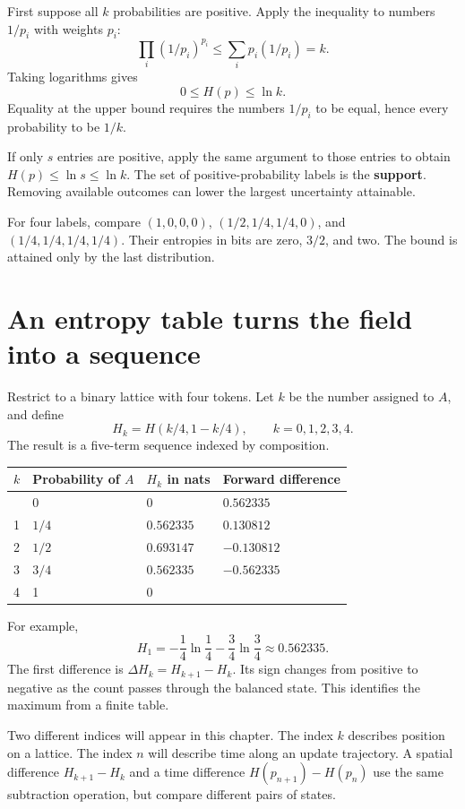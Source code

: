 \documentclass[11pt,oneside,openany]{book}
\theoremstyle{definition}
\theoremstyle{remark}
\numberwithin{equation}{chapter}
\begin{document}
First suppose all \(k\) probabilities are positive. Apply the inequality to numbers \(1/p_i\) with weights \(p_i\): \[\prod_i(1/p_i)^{p_i}\leq\sum_i p_i(1/p_i)=k.\] Taking logarithms gives \[\boxed{0\leq H(p)\leq\ln k.}\] Equality at the upper bound requires the numbers \(1/p_i\) to be equal, hence every probability to be \(1/k\).

If only \(s\) entries are positive, apply the same argument to those entries to obtain \(H(p)\leq\ln s\leq\ln k\). The set of positive-probability labels is the \textbf{support}. Removing available outcomes can lower the largest uncertainty attainable.

For four labels, compare \((1,0,0,0)\), \((1/2,1/4,1/4,0)\), and \((1/4,1/4,1/4,1/4)\). Their entropies in bits are zero, \(3/2\), and two. The bound is attained only by the last distribution.

\section{An entropy table turns the field into a sequence}\label{ch05-an-entropy-table-turns-the-field-into-a-sequence}

Restrict to a binary lattice with four tokens. Let \(k\) be the number assigned to \(A\), and define \[H_k=H(k/4,1-k/4),\qquad k=0,1,2,3,4.\] The result is a five-term sequence indexed by composition.

\begin{longtable}[]{@{}llll@{}}
\toprule\noalign{}
\(k\) & Probability of \(A\) & \(H_k\) in nats & Forward difference \\
\midrule\noalign{}
\endhead
\bottomrule\noalign{}
\endlastfoot
0 & 0 & 0 & \(0.562335\) \\
1 & \(1/4\) & \(0.562335\) & \(0.130812\) \\
2 & \(1/2\) & \(0.693147\) & \(-0.130812\) \\
3 & \(3/4\) & \(0.562335\) & \(-0.562335\) \\
4 & 1 & 0 & \\
\end{longtable}

For example, \[H_1=-\frac14\ln\frac14-\frac34\ln\frac34\approx0.562335.\] The first difference is \(\Delta H_k=H_{k+1}-H_k\). Its sign changes from positive to negative as the count passes through the balanced state. This identifies the maximum from a finite table.

Two different indices will appear in this chapter. The index \(k\) describes position on a lattice. The index \(n\) will describe time along an update trajectory. A spatial difference \(H_{k+1}-H_k\) and a time difference \(H(p_{n+1})-H(p_n)\) use the same subtraction operation, but compare different pairs of states.
\end{document}
